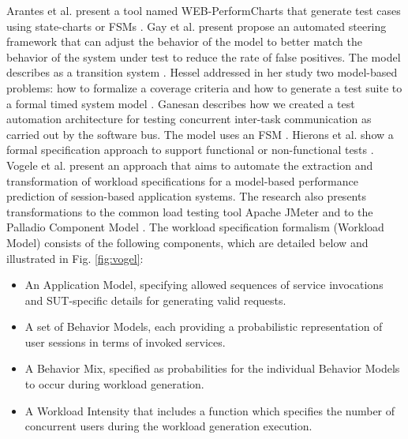 \documentclass[espaco=umemeio,chapter=TITLE,twoside,openright]{abnt}
\begin{document}
Arantes et al. present a tool named WEB-PerformCharts that generate test cases using state-charts or FSMs \cite{Arantes2014}. Gay et al. present propose an automated steering framework that can adjust the behavior of the model to better match the behavior of the system under test to reduce the rate of false positives.  The model describes as a transition system \cite{Gay2016}. Hessel addressed in her study two model-based problems: how to formalize a coverage criteria and how to generate a test suite to a formal timed system model \cite{Hessel2007}. Ganesan describes how we created a test automation architecture for testing concurrent inter-task communication as carried out by the software bus. The model uses an FSM \cite{Ganesan2016}. Hierons et al. show a formal specification approach to support functional or non-functional tests \cite{Hierons2009}. Vogele et al. present an approach that aims to automate the extraction and transformation of workload specifications for a model-based performance prediction of session-based application systems.  The research also presents transformations to the common load testing tool Apache JMeter and to the Palladio Component Model \cite{Vogele2016} \cite{utting2010practical}. The workload specification formalism (Workload Model) consists of the following components, which are detailed below and illustrated in Fig. \ref{fig:vogel}:
\begin{itemize}
\item An Application Model, specifying allowed sequences of service invocations and SUT-specific details for generating valid requests.
\item A set of Behavior Models, each providing a probabilistic representation of user sessions in terms of invoked services.
\item A Behavior Mix, specified as probabilities for the individual Behavior Models to occur during workload generation.
\item A Workload Intensity that includes a function which specifies the number of concurrent users during the workload generation execution.
\end{itemize}
\end{document}
